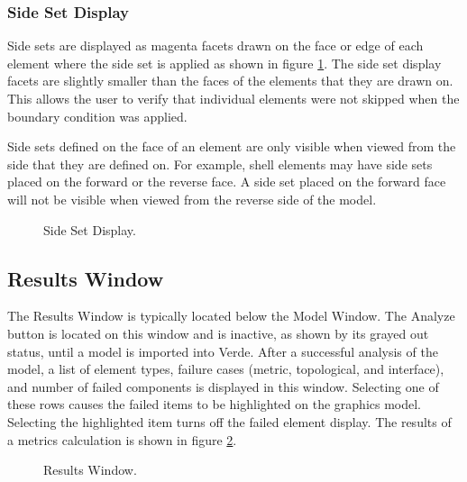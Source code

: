 \documentclass[10pt]{report}
\begin{document}
\subsubsection{Side Set Display}
\label{sidesets}

Side sets are displayed as magenta facets drawn on the face or edge of 
each element where the
side set is applied as shown in figure \ref{fig:sidesets}. The side set display
facets are slightly smaller than the faces of the elements that they are
drawn on.  This allows the user to verify that individual elements were not
skipped when the boundary condition was applied.

Side sets defined on the face of an element are only visible when viewed
from the side that they are defined on.  For example, shell elements may
have side sets placed on the forward or the reverse face.  A side set placed
on the forward face will not be visible when viewed from the reverse side
of the model.

\htmlrule
\begin{figure}[tbh]
  \begin{center}
              {}
    \caption{Side Set Display.}
    \label{fig:sidesets}
  \end{center}
\end{figure}     

\subsection{Results Window}
\label{results_window}
The Results Window is typically located below the Model Window.  
The Analyze button is located on this window and is inactive, as 
shown by its grayed out status, until a model is imported into Verde.  
After a successful analysis of the model, a list of 
element types, failure cases (metric, topological, and interface), 
and number of failed components is 
displayed in this window.  Selecting one of these rows causes the 
failed items to be highlighted on the graphics model.  Selecting
the highlighted item turns off the failed element display. The results 
of a metrics calculation is shown in figure \ref{fig:results_window}.

\htmlrule
\begin{figure}[tbh]
  \begin{center}
              {}
    \caption{Results Window.}
    \label{fig:results_window}
  \end{center}
\end{figure}     
\end{document}
